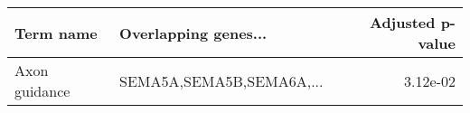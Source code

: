 \begin{tabular}{llr}
\toprule
    Term name &     Overlapping genes... &  Adjusted p-value \\
\midrule
Axon guidance & SEMA5A,SEMA5B,SEMA6A,... &          3.12e-02 \\
\bottomrule
\end{tabular}
